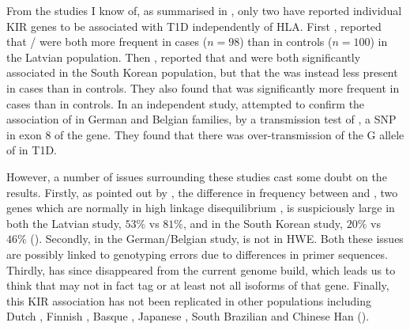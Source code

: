 From the studies I know of, as summarised in ,
only two have reported individual KIR genes to be associated with T1D independently of \gls{HLA}.
First \citet{NikitinaZake:2004jv}, reported that / were both more frequent in cases ($n=98$) than in controls ($n=100$) in the Latvian population.
Then \citet{PARK:2006km},  reported that  and  were both significantly associated in the South Korean population,
but that the  was instead less present in cases than in controls.
They also found that  was significantly more frequent in cases than in controls.
In an independent study, \citet{RamosLopez:2009jf} attempted to confirm the association of  in German and Belgian families,
by a transmission test of , a \gls{SNP} in exon 8 of the  gene.
They found that there was over-transmission of the G allele of  in \gls{T1D}.

However, a number of issues surrounding these studies cast some doubt on the results.
Firstly, as pointed out by \citet{Middleton:2006ba}, the difference in frequency between  and ,
two genes which are normally in high linkage disequilibrium \citep{Single:2007br}, 
is suspiciously large in both the Latvian study, $53\%$ vs $81\%$, and in the South Korean study, $20\%$ vs $46\%$ ().
Secondly, in the \citet{RamosLopez:2009jf} German/Belgian study,  is not in \gls{HWE}.
Both these issues are possibly linked to genotyping errors due to differences in primer sequences.
Thirdly,  has since disappeared from the current genome build,
which leads us to think that  may not in fact tag  or at least not all isoforms of that gene.
Finally, this KIR association has not been replicated in other populations including
Dutch \citep{vanderSlik:2003gq},
Finnish \citep{Middleton:2006ba},
Basque \citep{Santin:2006hh},
Japanese \citep{Mogami:2007gj},
South Brazilian \citep{Jobim:2010}
and
Chinese Han \citep{Zhi:2011kl} ().

\clearpage

